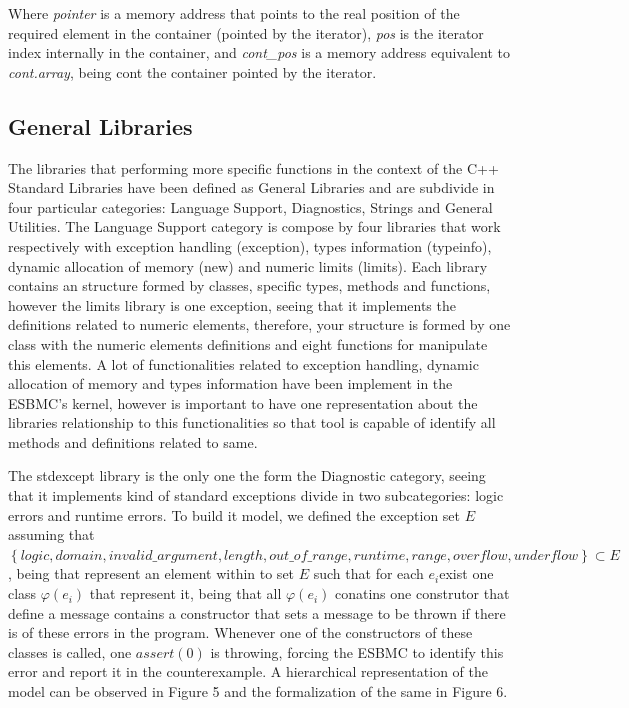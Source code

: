 \documentclass[a4paper]{llncs}
\begin{document}
	Where \textit{pointer} is a memory address that points to the real position of the required element in the container (pointed by the iterator), \textit{pos} is the iterator index internally in the container, and \textit{cont\_pos} is a memory address equivalent to \textit{cont.array}, being cont the container pointed by the iterator.

%
\subsection{General Libraries}
%
The libraries that performing more specific functions in the context of the C++ Standard
Libraries have been defined as General Libraries and are subdivide in four particular categories:
Language Support, Diagnostics, Strings and General Utilities.
The Language Support category is compose by four libraries that work respectively with
exception handling (exception), types information (typeinfo), dynamic allocation of memory (new) and 
numeric limits (limits). Each library contains an structure formed by classes, specific types, methods
and functions, however the limits library is one exception, seeing that it implements the definitions
related to numeric elements, therefore, your structure is formed by one class with the numeric
elements definitions and eight functions for manipulate this elements. A lot of functionalities related to
exception handling, dynamic allocation of memory and types information have been implement in the
ESBMC's kernel, however is important to have one representation about the libraries relationship to
this functionalities so that tool is capable of identify all methods and definitions related to same.

The stdexcept library is the only one the form the Diagnostic category, seeing that it
implements kind of standard exceptions divide in two subcategories: logic errors and runtime errors. To build it model, we defined the exception set 
$E$ assuming that $\left\{logic, domain, invalid\_argument, length, out\_of\_range, runtime, range, overflow, underflow\right\} \subset E$, 
being that represent an element within to set $E$ such that for each $e_{i}$exist
one class $\varphi(e_{i})$ that represent it, being that all $\varphi(e_{i})$ conatins one construtor that define a message contains a
constructor that sets a message to be thrown if there is of these errors in the program. Whenever one
of the constructors of these classes is called, one $assert(0)$ is throwing, forcing the ESBMC to identify this
error and report it in the counterexample. A hierarchical representation of the model can be observed
in Figure 5 and the formalization of the same in Figure 6.
\end{document}
